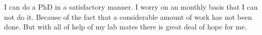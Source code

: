 \documentclass{article}
\begin{document}
I can do a PhD in a satisfactory manner. 
I worry on an monthly basis that I can not do it.
Because of the fact that a considerable amount of work has not been done. 
But with all of help of my lab mates there is great deal of hope for me. 
\end{document}
